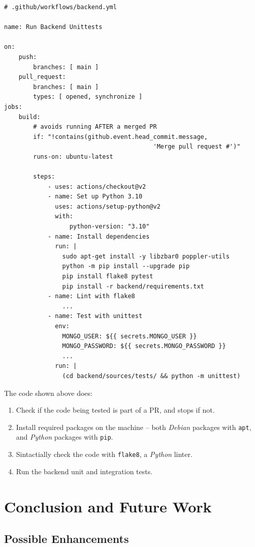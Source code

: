 \documentclass[11pt, a4paper]{report}
\def\code#1{\texttt{#1}}
\begin{document}
\begin{verbatim}
# .github/workflows/backend.yml

name: Run Backend Unittests

on:
    push:
        branches: [ main ]
    pull_request:
        branches: [ main ]
        types: [ opened, synchronize ]
jobs:
    build:
        # avoids running AFTER a merged PR
        if: "!contains(github.event.head_commit.message,
                                         'Merge pull request #')"
        runs-on: ubuntu-latest

        steps:
            - uses: actions/checkout@v2
            - name: Set up Python 3.10
              uses: actions/setup-python@v2
              with:
                  python-version: "3.10"
            - name: Install dependencies
              run: |
                sudo apt-get install -y libzbar0 poppler-utils
                python -m pip install --upgrade pip
                pip install flake8 pytest
                pip install -r backend/requirements.txt
            - name: Lint with flake8
                ...
            - name: Test with unittest
              env:
                MONGO_USER: ${{ secrets.MONGO_USER }} 
                MONGO_PASSWORD: ${{ secrets.MONGO_PASSWORD }}
                ...
              run: |
                (cd backend/sources/tests/ && python -m unittest)
\end{verbatim}

The code shown above does:
\begin{enumerate}
	\item Check if the code being tested is part of a PR, and stops if not. 
	\item Install required packages on the machine -- both \textit{Debian} packages with \code{apt}, and \textit{Python} packages with \code{pip}.
	\item Sintactially check the code with \code{flake8}, a \textit{Python} linter.
	\item Run the backend unit and integration tests.
\end{enumerate}

\chapter{Conclusion and Future Work}

\section{Possible Enhancements}
\end{document}
